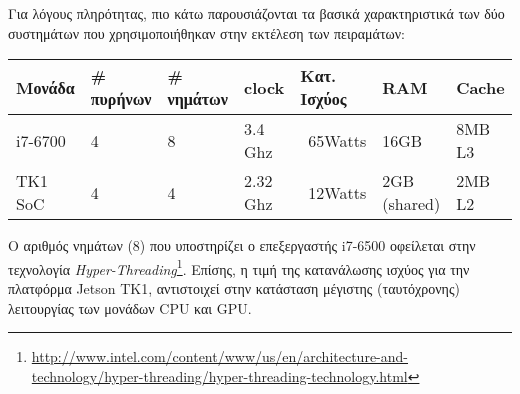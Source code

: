 

Για λόγους πληρότητας, πιο κάτω παρουσιάζονται τα βασικά χαρακτηριστικά
των δύο συστημάτων που χρησιμοποιήθηκαν στην εκτέλεση των πειραμάτων:
\begin{center}
\small
\begin{tabular}{ | l | l | l | l | l | l | l | }
  \hline
  \rowcolor{Gray}
  Μονάδα & \# πυρήνων & \# νημάτων & clock & Κατ. Ισχύος & RAM & Cache \\
  \hline
  i7-6700 & 4 & 8 & 3.4 Ghz & ~65Watts & 16GB & 8MΒ L3 \\
  \hline
  TK1 SoC & 4 & 4 & 2.32 Ghz & ~12Watts & 2GB (shared) & 2MB L2 \\
  \hline
\end{tabular}
\end{center}

Ο αριθμός νημάτων (8) που υποστηρίζει ο επεξεργαστής i7-6500 οφείλεται στην
τεχνολογία \emph{Hyper-Threading}\footnote{\url{http://www.intel.com/content/www/us/en/architecture-and-technology/hyper-threading/hyper-threading-technology.html}}.
Επίσης, η τιμή της κατανάλωσης ισχύος για την
πλατφόρμα Jetson TK1, αντιστοιχεί στην κατάσταση μέγιστης (ταυτόχρονης) λειτουργίας των μονάδων
CPU και GPU.





